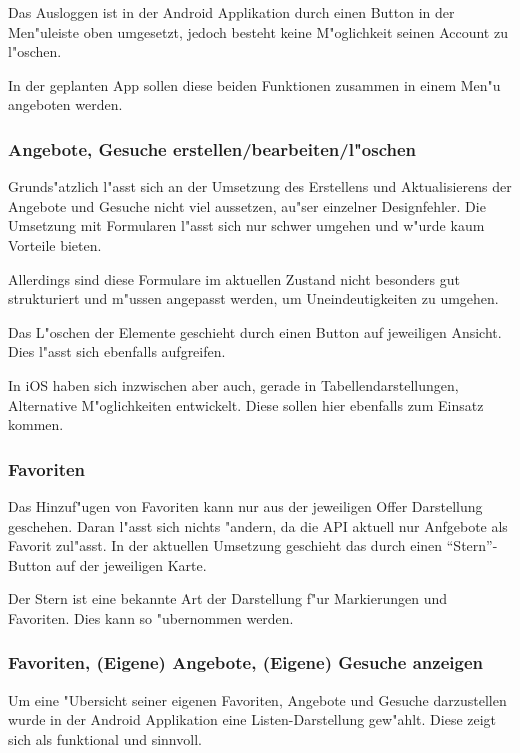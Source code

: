 Das Ausloggen ist in der Android Applikation durch einen Button in der Men"uleiste oben umgesetzt, jedoch besteht keine M"oglichkeit seinen Account zu l"oschen. 

In der geplanten App sollen diese beiden Funktionen zusammen in einem Men"u angeboten werden. 

\subsubsection*{Angebote, Gesuche erstellen/bearbeiten/l"oschen}

Grunds"atzlich l"asst sich an der Umsetzung des Erstellens und Aktualisierens der Angebote und Gesuche nicht viel aussetzen, au"ser einzelner Designfehler. 
Die Umsetzung mit Formularen l"asst sich nur schwer umgehen und w"urde kaum Vorteile bieten. 

Allerdings sind diese Formulare im aktuellen Zustand nicht besonders gut strukturiert und m"ussen angepasst werden, um Uneindeutigkeiten zu umgehen. 

Das L"oschen der Elemente geschieht durch einen Button auf jeweiligen Ansicht.
Dies l"asst sich ebenfalls aufgreifen. 

In iOS haben sich inzwischen aber auch, gerade in Tabellendarstellungen, Alternative M"oglichkeiten entwickelt. 
Diese sollen hier ebenfalls zum Einsatz kommen. 

\subsubsection*{Favoriten}

Das Hinzuf"ugen von Favoriten kann nur aus der jeweiligen Offer Darstellung geschehen.  Daran l"asst sich nichts "andern, da die API aktuell nur Anfgebote als Favorit zul"asst. 
In der aktuellen Umsetzung geschieht das durch einen \enquote{Stern}-Button auf der jeweiligen Karte. 

Der Stern ist eine bekannte Art der Darstellung f"ur Markierungen und Favoriten. 
Dies kann so "ubernommen werden. 

\subsubsection*{Favoriten, (Eigene) Angebote, (Eigene) Gesuche anzeigen}

Um eine "Ubersicht seiner eigenen Favoriten, Angebote und Gesuche darzustellen wurde in der Android Applikation eine Listen-Darstellung gew"ahlt. 
Diese zeigt sich als funktional und sinnvoll. 

